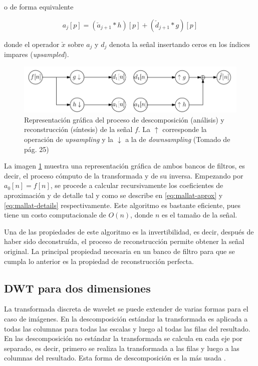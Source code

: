 \noindent o de forma equivalente 

\begin{equation}
	a_j[p] = ( \check a_{j+1} * h )[p] + ( \check d_{j+1} * g )[p]
\end{equation}

\noindent donde el operador $\check x$ sobre $a_j$ y $d_j$ denota la señal insertando ceros en los índices impares
(\textit{upsampled}).

\begin{figure}\label{fig:dwt-filterbanks-1D}
	\includegraphics[scale=0.5]{Graphics/dwt-filterbanks-1D.png}
	\caption{Representación gráfica del proceso de descomposición (análisis) y reconstrucción (síntesis) de la señal $f$. La $\uparrow$ corresponde la operación de \textit{upsampling} y la $\downarrow$ a la de \textit{downsampling} (Tomado de \cite{Recoskie2018LearningSO} pág. 25) }\label{fig:dwt-filterbanks-1D}
\end{figure}

La imagen \ref{fig:dwt-filterbanks-1D} muestra una representación gráfica de ambos bancos de filtros, es decir, 
el proceso cómputo de la transformada y de su inversa. Empezando por $a_0[n] = f[n]$, se procede a calcular recursivamente
los coeficientes de aproximación y de detalle tal y como se describe en \ref{eq:mallat-aprox} y \ref{eq:mallat-details}
respectivamente. Este algoritmo es bastante eficiente, pues tiene un costo computacionale de $O(n)$, donde $n$
es el tamaño de la señal. 

Una de las propiedades de este algoritmo es la invertibilidad, es decir, después de haber sido deconstruída, el proceso
de reconstrucción permite obtener la señal original. La principal propiedad necesaria en un banco de filtro 
para que se cumpla lo anterior es la propiedad de reconstrucción perfecta. 

\subsection{DWT para dos dimensiones}\label{section:dwt-2d}

La transformada discreta de wavelet se puede extender de varias formas para el caso de imágenes.
En la descomposición estándar la transformada es aplicada a todas las columnas para todas las escalas
y luego al todas las filas del resultado. En las descomposición no estándar la transformada se calcula en cada
eje por separado, es decir, primero se realiza la transformada a las filas y luego a las columnas del resultado. 
Esta forma de descomposición es la más usada \cite{WaveletVariants2D}.

